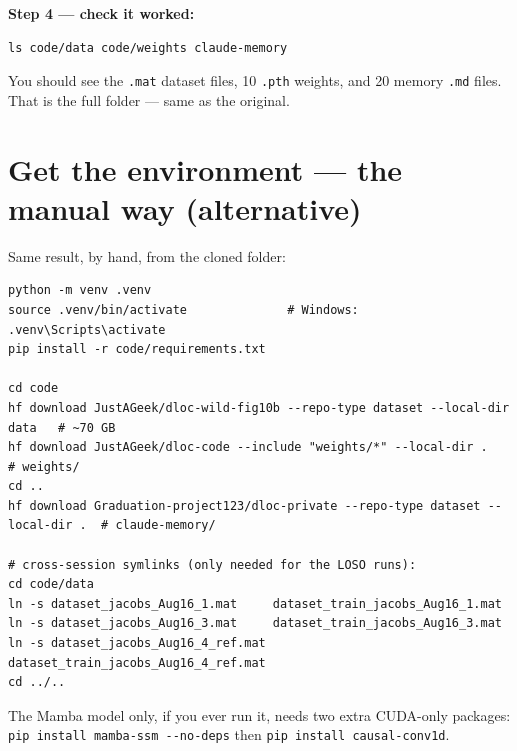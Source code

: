 \documentclass[11pt]{article}
\newcommand{\code}[1]{\lstinline[basicstyle=\ttfamily]|#1|}
\begin{document}
\textbf{Step 4 --- check it worked:}
\begin{lstlisting}
ls code/data code/weights claude-memory
\end{lstlisting}
You should see the \texttt{.mat} dataset files, 10 \texttt{.pth} weights, and 20 memory
\texttt{.md} files. That is the full folder --- same as the original.

\section{Get the environment --- the manual way (alternative)}
Same result, by hand, from the cloned folder:
\begin{lstlisting}
python -m venv .venv
source .venv/bin/activate              # Windows: .venv\Scripts\activate
pip install -r code/requirements.txt

cd code
hf download JustAGeek/dloc-wild-fig10b --repo-type dataset --local-dir data   # ~70 GB
hf download JustAGeek/dloc-code --include "weights/*" --local-dir .           # weights/
cd ..
hf download Graduation-project123/dloc-private --repo-type dataset --local-dir .  # claude-memory/

# cross-session symlinks (only needed for the LOSO runs):
cd code/data
ln -s dataset_jacobs_Aug16_1.mat     dataset_train_jacobs_Aug16_1.mat
ln -s dataset_jacobs_Aug16_3.mat     dataset_train_jacobs_Aug16_3.mat
ln -s dataset_jacobs_Aug16_4_ref.mat dataset_train_jacobs_Aug16_4_ref.mat
cd ../..
\end{lstlisting}
The Mamba model only, if you ever run it, needs two extra CUDA-only packages:
\code{pip install mamba-ssm --no-deps} then \code{pip install causal-conv1d}.

\end{document}
